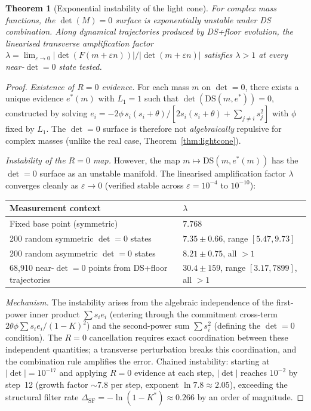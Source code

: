 \documentclass[11pt,a4paper]{article}
\newtheorem{theorem}{Theorem}[section]
\theoremstyle{definition}
\theoremstyle{remark}
\begin{document}
\begin{theorem}[Exponential instability of the light cone]\label{thm:instability}
For complex mass functions, the $\det(M)=0$ surface is exponentially unstable under DS combination. Along dynamical trajectories produced by DS+floor evolution, the linearised transverse amplification factor $\lambda=\lim_{\varepsilon\to 0}|\det(F(m+\varepsilon n))|/|\det(m+\varepsilon n)|$ satisfies $\lambda>1$ at every near-$\det=0$ state tested.
\end{theorem}

\begin{proof}
\emph{Existence of $R=0$ evidence.} For each mass $m$ on $\det=0$, there exists a unique evidence $e^*(m)$ with $L_1=1$ such that $\det(\mathrm{DS}(m,e^*))=0$, constructed by solving $e_i=-2\phi\, s_i(s_i+\theta)/[2s_i(s_i+\theta)+\sum_{j\neq i}s_j^2]$ with $\phi$ fixed by $L_1$. The $\det=0$ surface is therefore not \emph{algebraically} repulsive for complex masses (unlike the real case, Theorem~\ref{thm:lightcone}).

\emph{Instability of the $R=0$ map.} However, the map $m\mapsto\mathrm{DS}(m,e^*(m))$ has the $\det=0$ surface as an unstable manifold. The linearised amplification factor $\lambda$ converges cleanly as $\varepsilon\to 0$ (verified stable across $\varepsilon=10^{-4}$ to $10^{-10}$):

\begin{center}
\begin{tabular}{ll}
\toprule
Measurement context & $\lambda$ \\
\midrule
Fixed base point (symmetric) & $7.768$ \\
200 random symmetric $\det=0$ states & $7.35\pm 0.66$, range $[5.47, 9.73]$ \\
200 random asymmetric $\det=0$ states & $8.21\pm 0.75$, all ${}>1$ \\
68{,}910 near-$\det=0$ points from DS+floor trajectories & $30.4\pm 159$, range $[3.17, 7899]$, all ${}>1$ \\
\bottomrule
\end{tabular}
\end{center}

\emph{Mechanism.} The instability arises from the algebraic independence of the first-power inner product $\sum s_ie_i$ (entering through the commitment cross-term $2\theta\phi\sum s_ie_i/(1-K)^2$) and the second-power sum $\sum s_i^2$ (defining the $\det=0$ condition). The $R=0$ cancellation requires exact coordination between these independent quantities; a transverse perturbation breaks this coordination, and the combination rule amplifies the error. Chained instability: starting at $|\det|=10^{-17}$ and applying $R=0$ evidence at each step, $|\det|$ reaches $10^{-2}$ by step~12 (growth factor $\sim\!7.8$ per step, exponent $\ln 7.8\approx 2.05$), exceeding the structural filter rate $\Delta_{\mathrm{SF}}=-\ln(1-K^*)\approx 0.266$ by an order of magnitude.


\end{proof}
\end{document}
